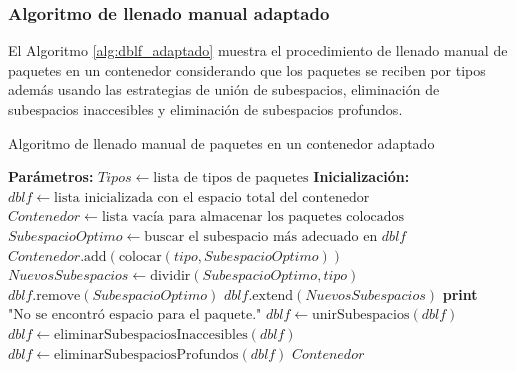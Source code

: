 \documentclass[openany]{article}
\begin{document}
\subsubsection{Algoritmo de llenado manual adaptado}

El Algoritmo \ref{alg:dblf_adaptado} muestra el procedimiento de llenado manual de paquetes en un contenedor considerando que los paquetes se reciben por tipos además usando las estrategias de unión de subespacios, eliminación de subespacios inaccesibles y eliminación de subespacios profundos.

\begin{algorithm}[H]
    \caption{Algoritmo de llenado manual de paquetes en un contenedor adaptado}
    \label{alg:dblf_adaptado}
    \begin{algorithmic}[1]
        \State \textbf{Parámetros:} $Tipos \gets \text{lista de tipos de paquetes}$
        \State \textbf{Inicialización:} $dblf \gets \text{lista inicializada con el espacio total del contenedor}$
        \State $Contenedor \gets \text{lista vacía para almacenar los paquetes colocados}$
        \State $SubespacioOptimo \gets \text{buscar el subespacio más adecuado en } dblf$
        \State $Contenedor.\text{add}( \text{colocar}(tipo, SubespacioOptimo) )$
        \State $NuevosSubespacios \gets \text{dividir}(SubespacioOptimo, tipo)$
        \State $dblf.\text{remove}(SubespacioOptimo)$
        \State $dblf.\text{extend}(NuevosSubespacios)$
        \Else
        \State \textbf{print} $\text{"No se encontró espacio para el paquete."}$
        \EndIf
        \EndFor
        \State $dblf \gets \text{unirSubespacios}(dblf)$
        \State $dblf \gets \text{eliminarSubespaciosInaccesibles}(dblf)$
        \State $dblf \gets \text{eliminarSubespaciosProfundos}(dblf)$
        \EndFor
        \State \Return $Contenedor$
    \end{algorithmic}
\end{algorithm}
\end{document}
